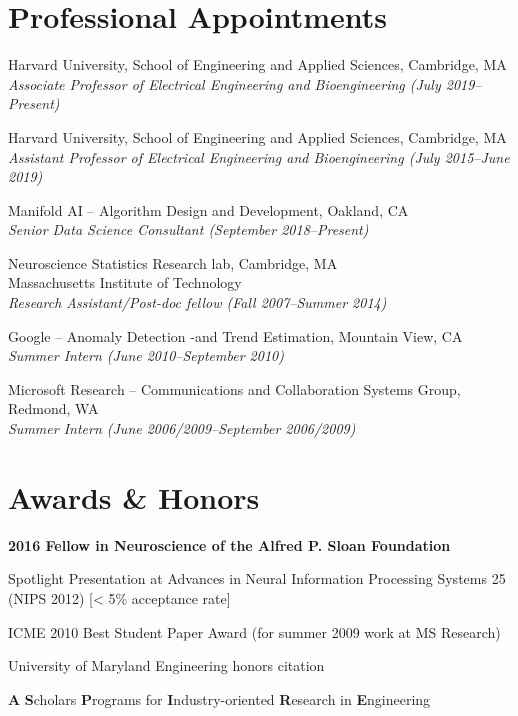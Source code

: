 \documentclass[12pt,letterpaper]{article}
\renewenvironment{itemize}{
  \begin{list}{}{
    \setlength{\leftmargin}{1.5em}
    \setlength{\itemsep}{0.25em}
    \setlength{\parskip}{0pt}
    \setlength{\parsep}{0.25em}
  }
}{
  \end{list}
}
\begin{document}
\section*{Professional Appointments}

\begin{itemize}
    \item Harvard University, School of Engineering and Applied Sciences, Cambridge, MA\\
          \emph{Associate Professor of Electrical Engineering and Bioengineering (July 2019--Present)}
          
    \item Harvard University, School of Engineering and Applied Sciences, Cambridge, MA\\
          \emph{Assistant Professor of Electrical Engineering and Bioengineering (July 2015--June 2019)}
          
    \item Manifold AI -- Algorithm Design and Development, Oakland, CA\\
          \emph{Senior Data Science Consultant (September 2018--Present)}
          
    \item Neuroscience Statistics Research lab, Cambridge, MA\\
          Massachusetts Institute of Technology \\
          \emph{Research Assistant/Post-doc fellow (Fall 2007--Summer 2014)}

    \item Google -- Anomaly Detection -and Trend Estimation, Mountain View, CA\\
          \emph{Summer Intern (June 2010--September 2010)}

    \item Microsoft Research -- Communications and Collaboration Systems Group, Redmond, WA\\
          \emph{Summer Intern (June 2006/2009--September 2006/2009)}
\end{itemize}

\section*{Awards \& Honors}

\begin{itemize}
	\item \textbf{2016 Fellow in Neuroscience of the Alfred P. Sloan Foundation}
    \item Spotlight Presentation at Advances in Neural Information Processing Systems 25 (NIPS 2012) [< 5\% acceptance rate]
    \item ICME 2010 Best Student Paper Award (for summer 2009 work at MS Research)
    \item University of Maryland Engineering honors citation
    \item \textbf{A} \textbf{S}cholars \textbf{P}rograms for \textbf{I}ndustry-oriented \textbf{R}esearch in \textbf{E}ngineering
\end{itemize}
\end{document}
